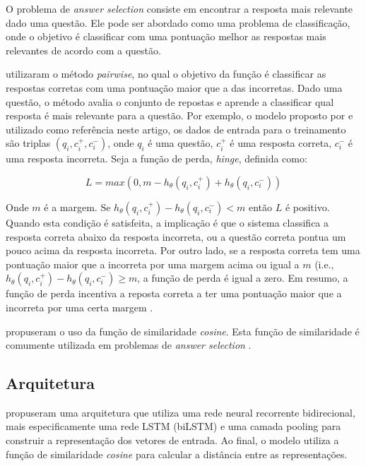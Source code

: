 \documentclass[12pt]{article}
\begin{document}
O problema de \textit{answer selection} consiste em encontrar a resposta mais relevante dado uma questão. Ele pode ser abordado como uma problema de classificação, onde
o objetivo é classificar com uma pontuação melhor as respostas mais relevantes de acordo com a questão.

\cite{tan-lstm-qa} utilizaram o método \textit{pairwise}, no qual o objetivo da função é classificar as respostas corretas com uma pontuação maior que a das incorretas. Dado uma questão,
o método avalia o conjunto de repostas e aprende a classificar qual resposta é mais relevante para a questão. Por exemplo, o modelo proposto por \cite{tan-lstm-qa} e utilizado como referência neste artigo, os dados de entrada para o treinamento
são triplas $(q_{i}, c_{i}^{+}, c_{i}^{-})$, onde $q_{i}$ é uma questão, $c_{i}^{+}$ é uma resposta correta, $c_{i}^{-}$ é uma resposta incorreta. Seja a função de perda, \textit{hinge}, definida como:

\begin{equation}
L = max(0, m - h_{\theta}(q_{i}, c_{i}^{+}) + h_{\theta}(q_{i}, c_{i}^{-}))   
\end{equation}


Onde $m$ é a margem. Se $h_{\theta}(q_{i}, c_{i}^{+}) - h_{\theta}(q_{i}, c_{i}^{-}) < m$ então $L$ é positivo. Quando esta condição é satisfeita, a implicação é que o sistema classifica a resposta correta abaixo da resposta incorreta, ou a questão correta pontua um pouco acima da resposta incorreta. Por outro lado, se a resposta correta tem uma pontuação maior que a incorreta por uma margem acima ou igual a $m$ (i.e., $h_{\theta}(q_{i}, c_{i}^{+}) - h_{\theta}(q_{i}, c_{i}^{-}) \geq m$, a função de perda é igual a zero. Em resumo, a função de perda incentiva a reposta correta a ter uma pontuação maior que a incorreta por uma certa margem \cite{lai-etal-2018-review}.

\cite{tan-lstm-qa} propuseram o uso da função de similaridade \textit{cosine}. Esta função de similaridade é comumente utilizada em problemas de \textit{answer selection} \cite{feng-answer-selection-2015}. 

\subsection{Arquitetura}

\cite{tan-lstm-qa} propuseram uma arquitetura que utiliza uma rede neural recorrente bidirecional, mais especificamente uma rede LSTM (biLSTM) \cite{hochreiter-Schmidhuber-lstm-1997} e uma camada pooling para construir a representação dos vetores de entrada. Ao final, o modelo utiliza a função de similaridade \textit{cosine} para calcular a distância
entre as representações. 
\end{document}
